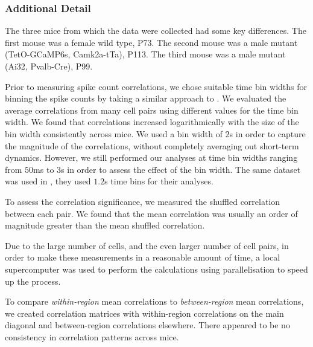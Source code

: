 \documentclass[a4paper,12pt]{article}
\theoremstyle{definition}
\begin{document}
\vspace{-0.5cm}
\subsubsection*{Additional Detail}
\vspace{-0.3cm}
The three mice from which the data were collected had some key differences. The first mouse was a female wild type, P73. The second mouse was a male mutant (TetO-GCaMP6s, Camk2a-tTa), P113. The third mouse was a male mutant (Ai32, Pvalb-Cre), P99.

Prior to measuring spike count correlations, we chose suitable time bin widths for binning the spike counts by taking a similar approach to \cite{cohen2}. We evaluated the average correlations from many cell pairs using different values for the time bin width. We found that correlations increased logarithmically with the size of the bin width consistently across mice. We used a bin width of $2$s in order to capture the magnitude of the correlations, without completely averaging out short-term dynamics. However, we still performed our analyses at time bin widths ranging from $50$ms to $3$s in order to assess the effect of the bin width. The same dataset was used in \cite{stringer}, they used $1.2$s time bins for their analyses.

To assess the correlation significance, we measured the shuffled correlation between each pair. We found that the mean correlation was usually an order of magnitude greater than the mean shuffled correlation. 

Due to the large number of cells, and the even larger number of cell pairs, in order to make these measurements in a reasonable amount of time, a local supercomputer was used to perform the calculations using parallelisation to speed up the process.

To compare \textit{within-region} mean correlations to \textit{between-region} mean correlations, we created correlation matrices with within-region correlations on the main diagonal and between-region correlations elsewhere. There appeared to be no consistency in correlation patterns across mice. %

\end{document}
